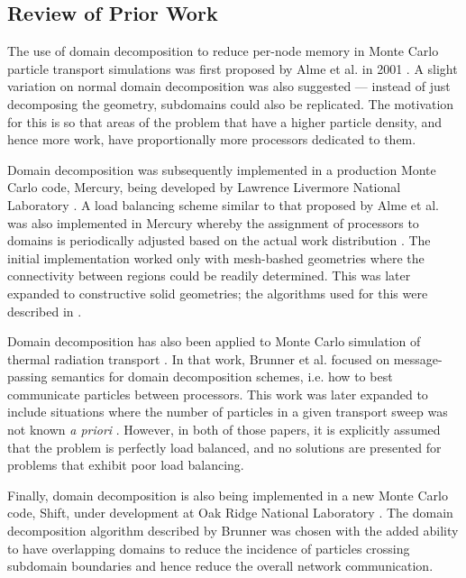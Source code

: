 \subsection{Review of Prior Work}

The use of domain decomposition to reduce per-node memory in Monte Carlo
particle transport simulations was first proposed by Alme et al. in 2001
\cite{js-alme-2001}. A slight variation on normal domain decomposition was also
suggested --- instead of just decomposing the geometry, subdomains could also be
replicated. The motivation for this is so that areas of the problem that have a
higher particle density, and hence more work, have proportionally more
processors dedicated to them.

Domain decomposition was subsequently implemented in a production Monte Carlo
code, Mercury, being developed by Lawrence Livermore National Laboratory
\cite{mc-procassini-2007}. A load balancing scheme similar to that proposed by
Alme et al. was also implemented in Mercury whereby the assignment of processors
to domains is periodically adjusted based on the actual work distribution
\cite{mc-procassini-2005}. The initial implementation worked only with
mesh-bashed geometries where the connectivity between regions could be readily
determined. This was later expanded to constructive solid geometries; the
algorithms used for this were described in \cite{mc-greenman-2009}.

Domain decomposition has also been applied to Monte Carlo simulation of thermal
radiation transport \cite{jcp-brunner-2006}. In that work, Brunner et
al. focused on message-passing semantics for domain decomposition schemes,
i.e. how to best communicate particles between processors. This work was later
expanded to include situations where the number of particles in a given
transport sweep was not known \emph{a priori} \cite{jcp-brunner-2009}. However,
in both of those papers, it is explicitly assumed that the problem is perfectly
load balanced, and no solutions are presented for problems that exhibit poor
load balancing.

Finally, domain decomposition is also being implemented in a new Monte Carlo
code, Shift, under development at Oak Ridge National Laboratory
\cite{physor-sly-2012}. The domain decomposition algorithm described by Brunner
\cite{jcp-brunner-2009} was chosen with the added ability to have overlapping
domains to reduce the incidence of particles crossing subdomain boundaries and
hence reduce the overall network communication.


